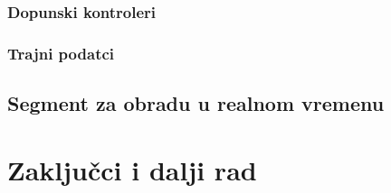 \documentclass[12pt,oneside]{memoir}
\begin{document}
	\subsection{Dopunski kontroleri}
	
	\subsection{Trajni podatci}

	\section{Segment za obradu u realnom vremenu}
	
	\chapter{Zaključci i dalji rad}
	
	\literatura
	
	\backmatter
	
\end{document}
